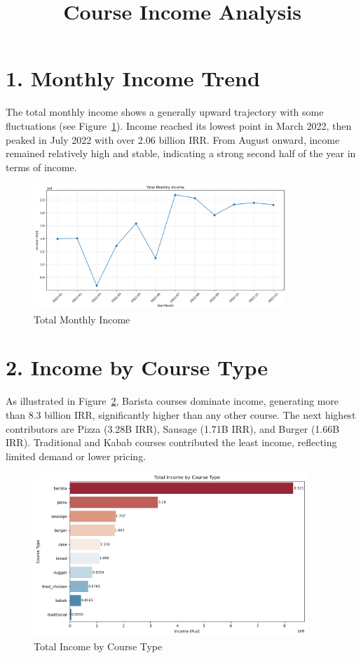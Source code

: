 \documentclass[12pt,a4paper]{article}
\title{Course Income Analysis}
\date{}
\begin{document}
\maketitle

\section*{1. Monthly Income Trend}

The total monthly income shows a generally upward trajectory with some fluctuations (see Figure~\ref{fig:monthly-income}). Income reached its lowest point in March 2022, then peaked in July 2022 with over 2.06 billion IRR. From August onward, income remained relatively high and stable, indicating a strong second half of the year in terms of income.

\begin{figure}[h!]
    \centering
    \includegraphics[width=0.85\textwidth]{Total Monthly Income.png}
    \caption{Total Monthly Income}
    \label{fig:monthly-income}
\end{figure}

\section*{2. Income by Course Type}

As illustrated in Figure~\ref{fig:income-by-course-type}, Barista courses dominate income, generating more than 8.3 billion IRR, significantly higher than any other course. The next highest contributors are Pizza (3.28B IRR), Sausage (1.71B IRR), and Burger (1.66B IRR). Traditional and Kabab courses contributed the least income, reflecting limited demand or lower pricing.

\begin{figure}[h!]
    \centering
    \includegraphics[width=0.92\textwidth]{Total Income by Course Type.png}
    \caption{Total Income by Course Type}
    \label{fig:income-by-course-type}
\end{figure}
\end{document}
